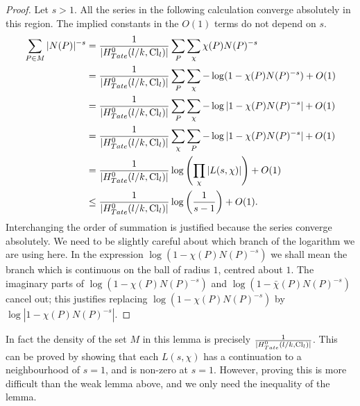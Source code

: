 \begin{proof}
	Let $s > 1$. All the series in the following calculation converge absolutely in this region.
	The implied constants in the $O(1)$ terms do not depend on $s$.
	\begin{align*}
		\sum_{P \in M} |N(P)|^{-s}
		&= \frac{1}{|H^0_{Tate}(l/k,\mathrm{Cl}_l)|} \sum_P \sum_\chi \chi(P) N(P)^{-s}\\
		&= \frac{1}{|H^0_{Tate}(l/k,\mathrm{Cl}_l)|}
		\sum_P \sum_\chi -\log(1-\chi(P) N(P)^{-s}) + O(1)\\
		&= \frac{1}{|H^0_{Tate}(l/k,\mathrm{Cl}_l)|}
		\sum_P \sum_\chi -\log |1-\chi(P) N(P)^{-s}| + O(1)\\
		&= \frac{1}{|H^0_{Tate}(l/k,\mathrm{Cl}_l)|}
		\sum_\chi \sum_P -\log |1-\chi(P) N(P)^{-s}| + O(1)\\
		&= \frac{1}{|H^0_{Tate}(l/k,\mathrm{Cl}_l)|} \log \left(\prod_\chi |L(s,\chi)| \right) + O(1)\\
		&\le \frac{1}{|H^0_{Tate}(l/k,\mathrm{Cl}_l)|} \log \left(\frac{1}{s-1}\right) + O(1).
	\end{align*}
	Interchanging the order of summation is justified because the series converge absolutely.
	We need to be slightly careful about which branch of the logarithm we are using here.
	In the expression $\log(1-\chi(P) N(P)^{-s})$ we shall mean the branch which is continuous
	on the ball of radius $1$, centred about $1$.
	The imaginary parts of $\log(1-\chi(P) N(P)^{-s})$ and $\log(1-\bar \chi(P) N(P)^{-s})$
	cancel out; this justifies replacing $\log(1-\chi(P) N(P)^{-s})$ by $\log |1-\chi(P) N(P)^{-s}|$.
\end{proof}

\begin{remark}
	In fact the density of the set $M$ in this lemma is precisely $\frac{1}{|H^0_{Tate}(l/k,\mathrm{Cl}_l)|}$.
	This can be proved by showing that each $L(s,\chi)$ has a continuation to a neighbourhood
	of $s=1$, and is non-zero at $s=1$.
	However, proving this is more difficult than the weak lemma above, and we only need the inequality
	of the lemma.
\end{remark}








